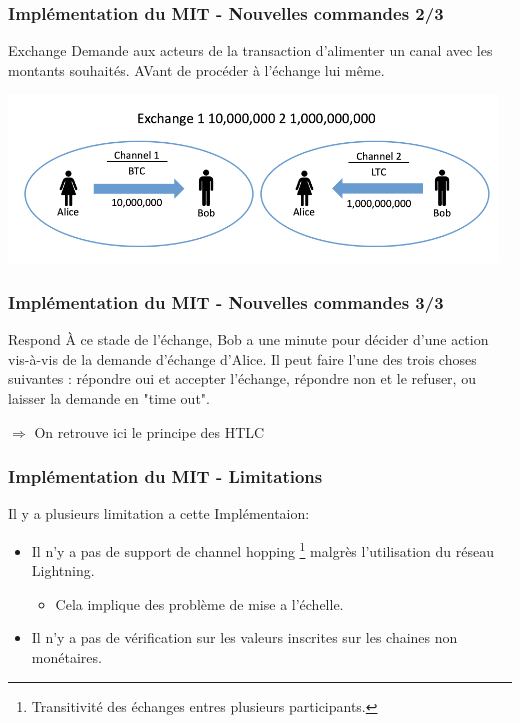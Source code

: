 \begin{frame}
  \frametitle{Implémentation du MIT - Nouvelles commandes 2/3}
  \begin{block}{Exchange}
Demande aux acteurs de la transaction d'alimenter un canal avec les montants souhaités. AVant de procéder à l'échange lui même.  
\end{block}
  \centering
  \includegraphics[scale = 0.6]{decentralisation/exchange.png}

\end{frame}

\begin{frame}
  \frametitle{Implémentation du MIT - Nouvelles commandes 3/3}
  \begin{block}{Respond}
    À ce stade de l'échange, Bob a une minute pour décider d'une action vis-à-vis de la demande d’échange d’Alice. Il peut faire l’une des trois choses suivantes : répondre oui et accepter l’échange, répondre non et le refuser, ou laisser la demande en "time out".  
  \end{block}
  $\Rightarrow$ On retrouve ici le principe des HTLC
\end{frame}

\begin{frame}
  \frametitle{Implémentation du MIT - Limitations}
  
  Il y a plusieurs limitation a cette Implémentaion:
  \newline
  \begin{itemize}
    \item Il n'y a pas de support de channel hopping \footnote{Transitivité des échanges entres plusieurs participants.} malgrès l'utilisation du réseau Lightning.
    \begin{itemize}
      \item Cela implique des problème de mise a l'échelle.
    \end{itemize}
    \item Il n'y a pas de vérification sur les valeurs inscrites sur les chaines non monétaires.
  \end{itemize}
\end{frame}